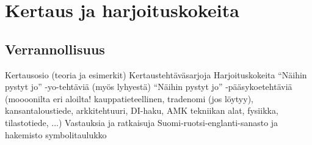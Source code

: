 %
\part{Kertaus ja harjoituskokeita}
\chapter{Verrannollisuus}

    Kertausosio (teoria ja esimerkit)
    Kertaustehtäväsarjoja
    Harjoituskokeita
    “Näihin pystyt jo” -yo-tehtäviä (myös lyhyestä)
    “Näihin pystyt jo” -pääsykoetehtäviä (moooonilta eri     aloilta! kauppatieteellinen, tradenomi (jos löytyy), kansantaloustiede, arkkitehtuuri, DI-haku, AMK tekniikan alat, fysiikka, tilastotiede, ...)
    Vastauksia ja ratkaisuja
    Suomi-ruotsi-englanti-sanasto ja hakemisto
    symbolitaulukko